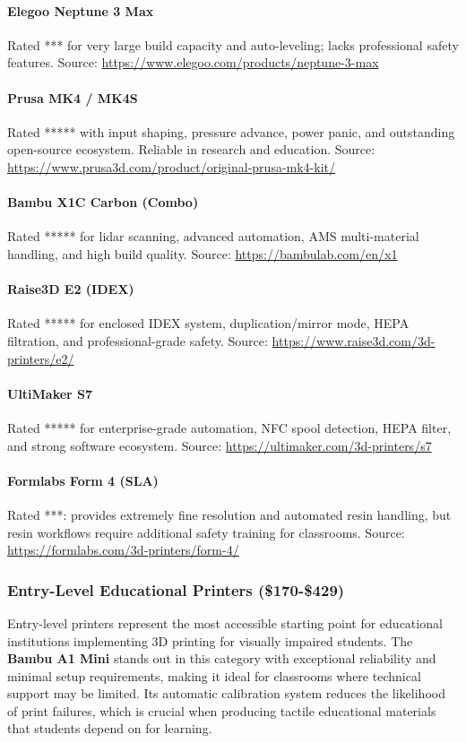\paragraph{Elegoo Neptune 3 Max}  
Rated *** for very large build capacity and auto-leveling; lacks professional safety features.  
Source: \url{https://www.elegoo.com/products/neptune-3-max}

\paragraph{Prusa MK4 / MK4S}  
Rated ***** with input shaping, pressure advance, power panic, and outstanding open-source ecosystem. Reliable in research and education.  
Source: \url{https://www.prusa3d.com/product/original-prusa-mk4-kit/}

\paragraph{Bambu X1C Carbon (Combo)}  
Rated ***** for lidar scanning, advanced automation, AMS multi-material handling, and high build quality.  
Source: \url{https://bambulab.com/en/x1}

\paragraph{Raise3D E2 (IDEX)}  
Rated ***** for enclosed IDEX system, duplication/mirror mode, HEPA filtration, and professional-grade safety.  
Source: \url{https://www.raise3d.com/3d-printers/e2/}

\paragraph{UltiMaker S7}  
Rated ***** for enterprise-grade automation, NFC spool detection, HEPA filter, and strong software ecosystem.  
Source: \url{https://ultimaker.com/3d-printers/s7}

\paragraph{Formlabs Form 4 (SLA)}  
Rated ***: provides extremely fine resolution and automated resin handling, but resin workflows require additional safety training for classrooms.  
Source: \url{https://formlabs.com/3d-printers/form-4/}

\subsubsection{Entry-Level Educational Printers (\$170-\$429)}
Entry-level printers represent the most accessible starting point for educational institutions implementing 3D printing for visually impaired students. The \textbf{Bambu A1 Mini} stands out in this category with exceptional reliability and minimal setup requirements, making it ideal for classrooms where technical support may be limited. Its automatic calibration system reduces the likelihood of print failures, which is crucial when producing tactile educational materials that students depend on for learning.

